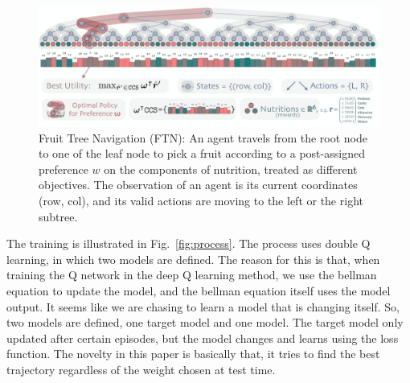 \documentclass[11pt,onecolumn]{IEEEtran}
\begin{document}
\begin{figure}[!htb]
    \centering
    \includegraphics[width=1\linewidth]{tree.png}
    \caption{Fruit Tree Navigation (FTN): An agent travels from the root node to one of the leaf node to pick a fruit according to a post-assigned preference $w$ on the components of nutrition, treated as different objectives. The observation of an agent is its current coordinates (row, col), and its valid actions are moving to the left or the right subtree.}
    \label{fig:blstm}
\end{figure}

The training is illustrated in Fig.~\ref{fig:process}. The process uses double Q learning, in which two models are defined. The reason for this is that, when training the Q network in the deep Q learning method, we use the bellman equation to update the model, and the bellman equation itself uses the model output. It seems like we are chasing to learn a model that is changing itself. So, two models are defined, one target model and one model. The target model only updated after certain episodes, but the model changes and learns using the loss function. The novelty in this paper is basically that, it tries to find the best trajectory regardless of the weight chosen at test time. 
\end{document}
